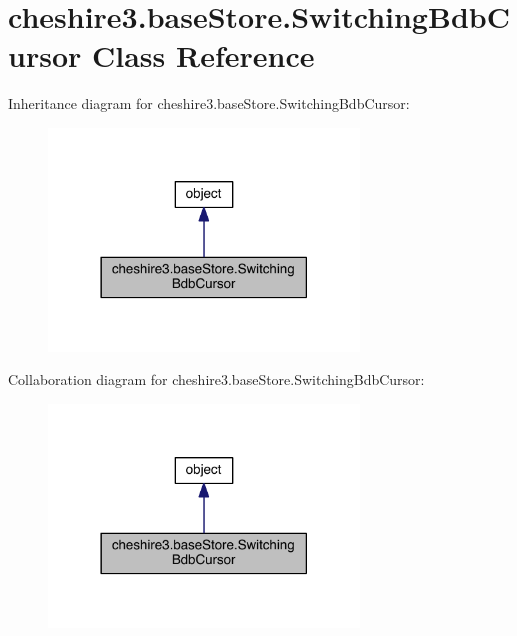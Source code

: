\hypertarget{classcheshire3_1_1base_store_1_1_switching_bdb_cursor}{\section{cheshire3.\-base\-Store.\-Switching\-Bdb\-Cursor Class Reference}
\label{classcheshire3_1_1base_store_1_1_switching_bdb_cursor}
}


Inheritance diagram for cheshire3.\-base\-Store.\-Switching\-Bdb\-Cursor\-:
\nopagebreak
\begin{figure}[H]
\begin{center}
\leavevmode
\includegraphics[width=234pt]{classcheshire3_1_1base_store_1_1_switching_bdb_cursor__inherit__graph}
\end{center}
\end{figure}


Collaboration diagram for cheshire3.\-base\-Store.\-Switching\-Bdb\-Cursor\-:
\nopagebreak
\begin{figure}[H]
\begin{center}
\leavevmode
\includegraphics[width=234pt]{classcheshire3_1_1base_store_1_1_switching_bdb_cursor__coll__graph}
\end{center}
\end{figure}
